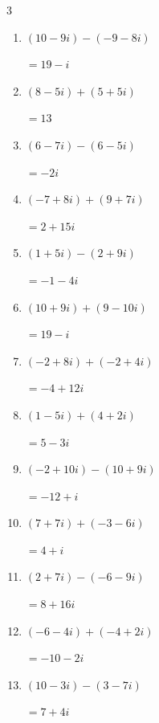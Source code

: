 \begin{multicols}{3}
\begin{enumerate}
        $\displaystyle =-14-5i$

  \item $\displaystyle (10-9i) - (-9-8i)$

        $\displaystyle =19-i$

  \item $\displaystyle (8-5i) + (5+5i)$

        $\displaystyle =13$

\columnbreak %

  \item $\displaystyle (6-7i) - (6-5i)$

        $\displaystyle =-2i$

  \item $\displaystyle (-7+8i) + (9+7i)$

        $\displaystyle =2+15i$

  \item $\displaystyle (1+5i) - (2+9i)$

        $\displaystyle =-1-4i$

  \item $\displaystyle (10+9i) + (9-10i)$

        $\displaystyle =19-i$

  \item $\displaystyle (-2+8i) + (-2+4i)$

        $\displaystyle =-4+12i$

  \item $\displaystyle (1-5i) + (4+2i)$

        $\displaystyle =5-3i$

  \item $\displaystyle (-2+10i) - (10+9i)$

        $\displaystyle =-12+i$

  \item $\displaystyle (7+7i) + (-3-6i)$

        $\displaystyle =4+i$

  \item $\displaystyle (2+7i) - (-6-9i)$

        $\displaystyle =8+16i$

  \item $\displaystyle (-6-4i) + (-4+2i)$

        $\displaystyle =-10-2i$

  \item $\displaystyle (10-3i) - (3-7i)$

        $\displaystyle =7+4i$


\end{enumerate}
\end{multicols}
